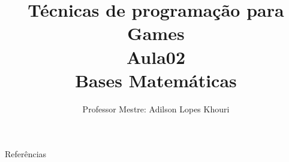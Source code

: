 \documentclass[compress, hyperref={pdfpagelayout=SinglePage}]{beamer}
\title[AED - Aula 02]{Técnicas de programação para Games \\ Aula02 \\ Bases Matemáticas}
\author{Professor Mestre: Adilson Lopes Khouri}
\begin{document}
	\begin{frame}
		\titlepage
	\end{frame}

	
	
	
	

	
	
	
			
	

	


	\begin{frame}{}
		\begin{block}{Referências}
			\tiny
			\nocite{*}
			
	    		
		\end{block}
	\end{frame}
\end{document}
